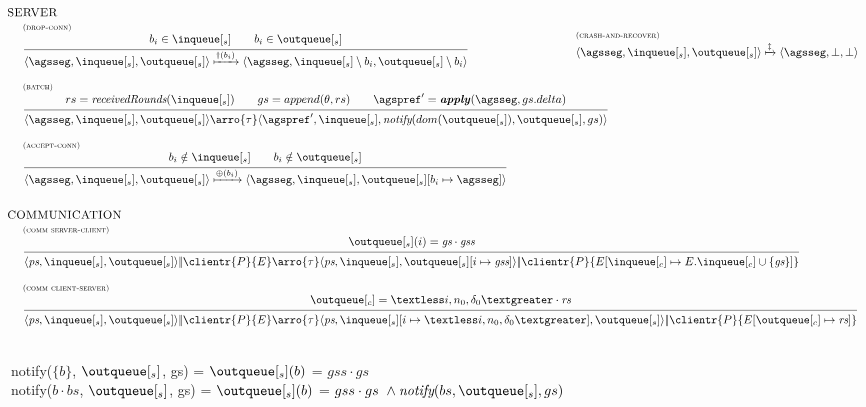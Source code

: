 \documentclass[envcountsect,runningheads,orivec]{llncs}
\begin{document}
 \[
 \begin{array}{l}
    \hspace{-.3cm} \textsc{SERVER}\\
    
\mathrule{drop-conn}{b_i \in \inserver \qquad  b_i \in \outserver}{\server{\persistedstate}{\inserver}{\outserver} \auxarro{\dropconn{b_i}} \server{\persistedstate}{\inserver \setminus b_i}{\outserver \setminus b_i}} 
\hfill
\mathax{crash-and-recover}{\server{\persistedstate}{\inserver}{\outserver} \auxarro{\crashandrecover} \server{\persistedstate}{\undefined}{\undefined}}

\\[25pt]

\mathrule{batch}{rs=\receiveroundsname{\inserver} \qquad gs=\append{\emptygssegment}{rs} \qquad \agspref'=\applyplus{\persistedstate}{gs.delta}}{\server{\persistedstate}{\inserver}{\outserver} \arro{\tau} \server{\agspref'}{\inserver}{\notify{dom(\outserver)}{\outserver}{gs}}}

\\[25pt]

\mathrule{accept-conn}{b_i \notin \inserver \qquad b_i \notin \outserver}{\server{\persistedstate}{\inserver}{\outserver} \auxarro{\acceptconn{b_i}} \server{\persistedstate}{\inserver}{\update{\outserver}{b_i}{\persistedstate}}}

    \\[35pt]
    \hspace{-.3cm} \textsc{COMMUNICATION}
		
\\
    \mathrule{comm server-client}{\outserver(i)=\gs \cdot \gss}{\server{\state}{\inserver}{\outserver} \bigpar \clientr{P}{\stateclient} \arro{\tau} \server{\state}{\inserver}{\update{\outserver}{i}{\gss}} \bigpar 
		\clientr{P}{\update{E}{\inclient}{E.\inclient \cup \{\gs\}}}}
		
\\[25pt]

	    \mathrule{comm client-server}{\outclient=\headerround \cdot \tailround}{\server{\state}{\inserver}{\outserver} \bigpar \clientr{P}{\stateclient} \arro{\tau} \server{\state}{\update{\inserver}{i}{\headerround}}{\outserver} \bigpar 
		\clientr{P}{\update{E}{\outclient}{\tailround}}}	
 \\

 \end{array}
 \]

\newpage


\begin{flushleft}
\\
notify($\{b\}$, $\outserver$, gs) = $\outserver(b)$ = $gss \cdot gs$ \\
notify($b \cdot bs$, $\outserver$, gs) = $\outserver(b)$ = $gss \cdot gs\ \land \notify{bs}{\outserver}{gs}$ 
\end{flushleft}
\end{document}
